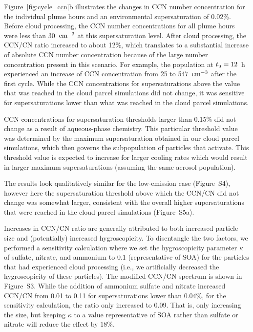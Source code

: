 \documentclass[edeposit,fullpage]{uiucthesis2009}
\begin{document}
Figure~\ref{fig:cycle_ccn}b illustrates the changes in CCN number
concentration for the individual plume hours and an environmental
supersaturation of 0.02\%. Before cloud processing, the CCN number
concentrations for all plume hours were less than 30~$\rm cm^{-3}$ at
this supersaturation level. After cloud processing, the CCN/CN
  ratio increased to about 12\%, which translates to a substantial
  increase of absolute CCN number concentration because of the large
  number concentration present in this scenario. For example, the
  population at $t_{\rm u} = 12$~h experienced an increase of CCN
  concentration from 25 to 547~$\rm cm^{-3}$ after the first
  cycle. While the CCN concentrations for supersaturations above the
  value that was reached in the cloud parcel simulations did not
  change, it was sensitive for supersaturations lower than what
  was reached in the cloud parcel simulations.

CCN concentrations for supersaturation thresholds larger than 0.15\%
did not change as a result of aqueous-phase chemistry. This particular
threshold value was determined by the maximum supersaturation obtained
in our cloud parcel simulations, which then governs the subpopulation
of particles that activate. This threshold value is expected to
increase for larger cooling rates which would result in larger maximum
supersaturations (assuming the same aerosol population).

The results look qualitatively similar for the low-emission
  case (Figure~S4), however here the supersaturation threshold above
  which the CCN/CN did not change was somewhat larger, consistent
  with the overall higher supersaturations that were reached in the
  cloud parcel simulations (Figure~S5a).

Increases in CCN/CN ratio are generally attributed to both
  increased particle size and (potentially) increased
  hygroscopicity. To disentangle the two factors, we performed a
  sensitivity calculation where we set the hygroscopicity parameter
  $\kappa$ of sulfate, nitrate, and ammonium to 0.1 (representative of
  SOA) for the particles that had experienced cloud processing (i.e.,
  we artificially decreased the hygroscopicity of these particles). The
  modified CCN/CN spectrum is shown in Figure~S3. While the addition
  of ammonium sulfate and nitrate increased CCN/CN from 0.01 to 0.11
  for supersaturations lower than 0.04\%, for the sensitivity
  calculation, the ratio only increased to 0.09. That is, only
  increasing the size, but keeping $\kappa$ to a value representative
  of SOA rather than sulfate or nitrate will reduce the effect by
  18\%.
\end{document}
